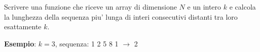 \begin{Exercise}[label={ex:sequenza}]
	Scrivere una funzione che riceve un array di dimensione $N$ e un intero $k$ e calcola la lunghezza della sequenza piu' lunga di interi consecutivi distanti tra loro esattamente $k$.

	\textbf{Esempio}: $k=3$, sequenza: 1 2 5 8 1 $\rightarrow$ 2
\end{Exercise}

\begin{Answer}[ref={ex:sequenza}]
  	
\end{Answer}